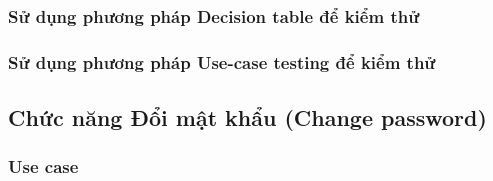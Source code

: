 \documentclass[a4paper, 12pt]{article}
\begin{document}
\subsubsection{Sử dụng phương pháp Decision table để kiểm thử}
\subsubsection{Sử dụng phương pháp Use-case testing để kiểm thử}

\subsection{Chức năng Đổi mật khẩu (Change password)}
\subsubsection{Use case}
\end{document}

